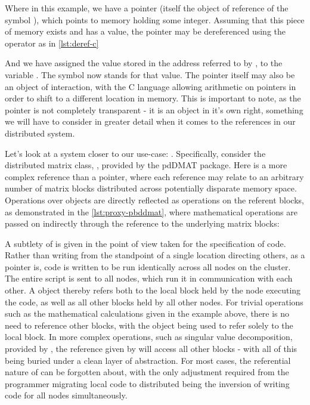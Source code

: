 
Where in this example, we have a pointer (itself the object of reference
of the symbol ), which points to memory holding some integer.
Assuming that this piece of memory exists and has a value, the pointer
may be dereferenced using the  operator as in \cref{lst:deref-c}


And we have assigned the value stored in the address referred to by
, to the variable . The symbol  now stands
for that value. The pointer itself may also be an object of interaction,
with the C language allowing arithmetic on pointers in order to shift to
a different location in memory. This is important to note, as the
pointer is not completely transparent - it is an object in it's own
right, something we will have to consider in greater detail when it
comes to the references in our distributed system.

Let's look at a system closer to our use-case: . Specifically,
consider the distributed matrix class, , provided by
the pdDMAT package. Here is a more complex reference than a pointer,
where each  reference may relate to an arbitrary number
of matrix blocks distributed across potentially disparate memory space.
Operations over  objects are directly reflected as
operations on the referent blocks, as demonstrated in the \cref{lst:proxy-pbddmat},
where mathematical operations are passed on indirectly through
the  reference to the underlying matrix blocks:


A subtlety of  is given in the point of view taken for the
specification of code. Rather than writing from the standpoint of a
single location directing others, as a pointer is,  code is written
to be run identically across all nodes on the cluster. The entire script
is sent to all nodes, which run it in communication with each other. A
 object thereby refers both to the local block held by
the node executing the code, as well as all other blocks held by all
other nodes. For trivial operations such as the mathematical
calculations given in the example above, there is no need to reference
other blocks, with the  object being used to refer
solely to the local block. In more complex operations, such as singular
value decomposition, provided by , the reference given by
 will access all other blocks - with all of this being
buried under a clean layer of abstraction. For most cases, the
referential nature of  can be forgotten about, with the
only adjustment required from the programmer migrating local code to
distributed being the inversion of writing code for all nodes
simultaneously.

